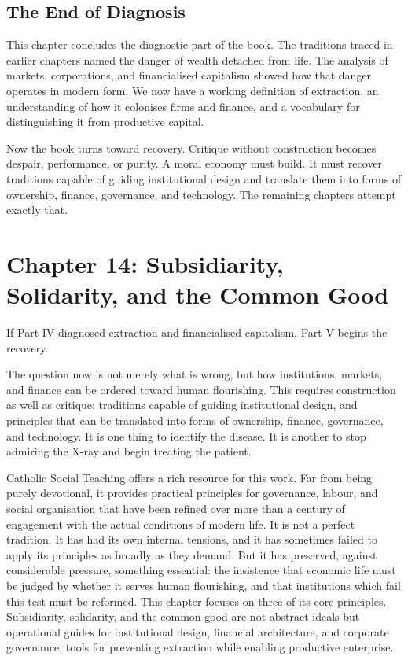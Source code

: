 \documentclass[11pt,a4paper,oneside]{book}
\begin{document}
\section*{The End of Diagnosis}

This chapter concludes the diagnostic part of the book. The traditions traced in earlier chapters named the danger of wealth detached from life. The analysis of markets, corporations, and financialised capitalism showed how that danger operates in modern form. We now have a working definition of extraction, an understanding of how it colonises firms and finance, and a vocabulary for distinguishing it from productive capital.

Now the book turns toward recovery. Critique without construction becomes despair, performance, or purity. A moral economy must build. It must recover traditions capable of guiding institutional design and translate them into forms of ownership, finance, governance, and technology. The remaining chapters attempt exactly that.

\chapter*{Chapter 14: Subsidiarity, Solidarity, and the Common Good}

If Part IV diagnosed extraction and financialised capitalism, Part V begins the recovery.

The question now is not merely what is wrong, but how institutions, markets, and finance can be ordered toward human flourishing. This requires construction as well as critique: traditions capable of guiding institutional design, and principles that can be translated into forms of ownership, finance, governance, and technology. It is one thing to identify the disease. It is another to stop admiring the X-ray and begin treating the patient.

Catholic Social Teaching offers a rich resource for this work. Far from being purely devotional, it provides practical principles for governance, labour, and social organisation that have been refined over more than a century of engagement with the actual conditions of modern life. It is not a perfect tradition. It has had its own internal tensions, and it has sometimes failed to apply its principles as broadly as they demand. But it has preserved, against considerable pressure, something essential: the insistence that economic life must be judged by whether it serves human flourishing, and that institutions which fail this test must be reformed. This chapter focuses on three of its core principles. Subsidiarity, solidarity, and the common good are not abstract ideals but operational guides for institutional design, financial architecture, and corporate governance, tools for preventing extraction while enabling productive enterprise.
\end{document}
